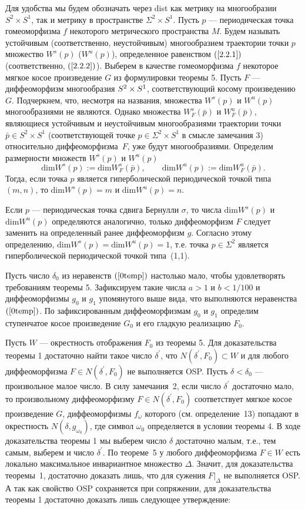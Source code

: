 \documentclass[12pt]{article}
\begin{document}
Для удобства мы будем обозначать через dist как метрику на многообразии $S^2\times S^1$, так и метрику в пространстве $\Sigma^2\times S^1$. 
Пусть $p$ --- периодическая точка гомеоморфизма $f$ некоторого метрического пространства $M$.
Будем называть устойчивым (соответственно, неустойчивым) многообразием траектории точки $p$ множество $W^s(p)$ ($W^u(p)$), определенное равенством $(\ref{2.2.1})$ (соответственно, $(\ref{2.2.2})$).
Выберем в качестве гомеоморфизма $f$ некоторое мягкое косое произведение $G$ из формулировки теоремы 5. Пусть $F$ --- диффеоморфизм многообразия $S^2\nobreak\times\nobreak S^1$, соответствующий косому произведению~$G$. 
Подчеркнем, что, несмотря на названия, множества $W^s(p)$ и $W^u(p)$ многообразиями не являются. Однако множества $W^s_F(\bar{p})$ и $W^u_F(\bar{p})$, являющиеся устойчивым и неустойчивым многообразиями траектории точки $\bar{p}\in S^2\times S^1$ (соответствующей точке $p\in\Sigma^2\times S^1$ в смысле замечания 3) относительно диффеоморфизма~$F$, уже будут многообразиями.
Определим размерности множеств $W^s(p)$ и $W^u(p)$
$$\textrm{dim}W^s(p):=\textrm{dim}W^s_F(\bar{p}),\qquad\textrm{dim}W^u(p):=\textrm{dim}W^u_F(\bar{p}).$$
Тогда, если точка $p$ является гиперболической периодической точкой типа $(m,n)$, то
$\textrm{dim}W^s(p)=m$ и $\textrm{dim}W^u(p)=n$.
 
Если $p$ --- периодическая точка сдвига Бернулли $\sigma$, то числа $\textrm{dim}W^s(p)$ и $\textrm{dim}W^u(p)$ определяются аналогично, только диффеоморфизм $F$ следует заменить на определенный ранее диффеоморфизм $g$. Согласно этому определению, 
$\textrm{dim}W^s(p)=\textrm{dim}W^u(p)=1$,
т.е. точка $p\in\Sigma^2$ является гиперболической периодической точкой типа~(1,1).

Пусть число $\delta_0$ из неравенств $(\ref{0temp})$ настолько мало, чтобы удовлетворять требованиям теоремы 5. Зафиксируем такие числа $a>1$ и $b<1/100$ и диффеоморфизмы $g_0$ и $g_1$ упомянутого выше вида, что выполняются неравенства $(\ref{0temp})$. По зафиксированным диффеоморфизмам $g_0$ и $g_1$ определим ступенчатое косое произведение $G_0$ и его гладкую реализацию $F_0$.

Пусть $W$ --- окрестность отображения $F_0$ из теоремы 5. Для доказательства теоремы 1 достаточно найти такое число $\delta^{\prime}$, что
$N(\delta^{\prime},F_0)\subset W$ и для любого диффеоморфизма $F\in N(\delta^{\prime},F_0)$ не выполняется OSP.
Пусть $\delta<\delta_0$ --- произвольное малое число. 
В силу замечания~2, если число $\delta^{\prime}$ достаточно мало, то произвольному диффеоморфизму $F\in N(\delta^{\prime},F_0)$ соответствует мягкое косое произведение $G$, диффеоморфизмы $f_{\omega}$ которого (см. определение~13) попадают в окрестность $N(\delta,g_{\omega_0})$, где символ $\omega_0$ определяется в условии теоремы 4. В ходе доказательства теоремы 1 мы выберем число $\delta$ достаточно малым, т.е., тем самым, выберем и число $\delta^{\prime}$.
По теореме~5 у любого диффеоморфизма $F\in W$ есть локально максимальное инвариантное множество $\Delta$.
Значит, для доказательства теоремы~1, достаточно доказать лишь, что для сужения $F|_{\Delta}$ не выполняется OSP. А так как свойство OSP сохраняется при сопряжении, для доказательства теоремы 1 достаточно доказать лишь следующее утверждение:
\end{document}
